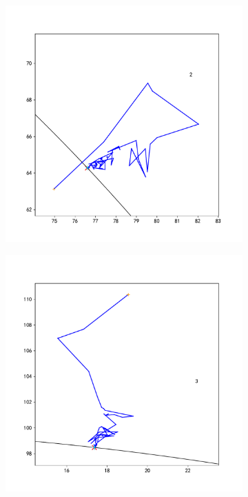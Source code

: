 \documentclass[withoutpreface,bwprint]{cumcmthesis} %
\begin{document}
\begin{figure}[H]
    \centering
    \begin{subfigure}{0.32\linewidth}
        \includegraphics[width=1.1\linewidth]{figures/c9_2.pdf}
    \end{subfigure}
    \begin{subfigure}{0.32\linewidth}
        \includegraphics[width=1.1\linewidth]{figures/c9_3.pdf}

\end{subfigure}
\end{figure}
\end{document}

